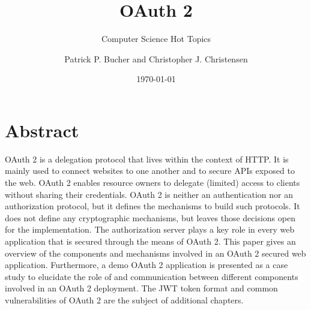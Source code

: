 \author{Patrick P. Bucher and  Christopher J. Christensen}
\title{OAuth 2}
\subtitle{Computer Science Hot Topics}
\date{\today}
\maketitle

\section*{Abstract}

OAuth 2 is a delegation protocol that lives within the context of HTTP. It is mainly used to connect websites to one another and to secure APIs exposed to the web. OAuth 2 enables resource owners to delegate (limited) access to clients without sharing their credentials. OAuth 2 is neither an authentication nor an authorization protocol, but it defines the mechanisms to build such protocols. It does not define any cryptographic mechanisms, but leaves those decisions open for the implementation. The authorization server plays a key role in every web application that is secured through the means of OAuth 2. This paper gives an overview of the components and mechanisms involved in an OAuth 2 secured web application. Furthermore, a demo OAuth 2 application is presented as a case study to elucidate the role of and communication between different components involved in an OAuth 2 deployment. The JWT token format and common vulnerabilities of OAuth 2 are the subject of additional chapters.
